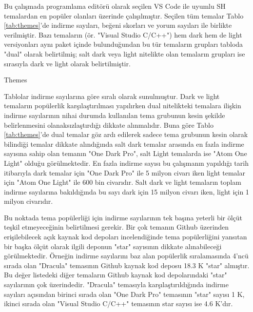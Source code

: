 \documentclass{article}
\begin{document}
Bu çalışmada programlama editörü olarak seçilen VS Code ile uyumlu SH temalardan en popüler olanları üzerinde
çalışılmıştır.  Seçilen tüm temalar Tablo \ref{tab:themes}'de indirme sayıları, beğeni skorları ve yorum sayıları ile
birlikte verilmiştir.  Bazı temaların (ör. "Visual Studio C/C++") hem dark hem de light versiyonları aynı paket içinde
bulunduğundan bu tür temaların grupları tabloda "dual" olarak belirtilmiş; salt dark veya light nitelikte olan temaların
grupları ise sırasıyla dark ve light olarak belirtilmiştir.


\begin{table}[H]

  \caption{Themes}
  \label{tab:themes}
\end{table}

Tablolar indirme sayılarına göre sıralı olarak sunulmuştur.  Dark ve light temaların popülerlik karşılaştırılması
yapılırken dual nitelikteki temalara ilişkin indirme sayılarının nihai durumda kullanılan tema grubunun kesin şekilde
belirlenmesini olanaksızlaştırdığı dikkate alınmalıdır.  Buna göre Tablo \ref{tab:themes}'de dual temalar göz ardı
edilerek sadece tema grubunun kesin olarak bilindiği temalar dikkate alındığında salt dark temalar arasında en fazla indirme
sayısına sahip olan temanın "One Dark Pro", salt Light temalarda ise "Atom One Light" olduğu görülmektedir. En fazla indirme sayısı bu
çalışmanın yapıldığı tarih itibarıyla dark temalar için "One Dark Pro" ile 5 milyon civarı iken light temalar için "Atom
One Light" ile 600 bin civarıdır. Salt dark ve light temaların toplam indirme sayılarına bakıldığında bu sayı dark için 15 milyon
civarı iken, light için 1 milyon civarıdır.

Bu noktada tema popülerliği için indirme sayılarının tek başına yeterli bir ölçüt teşkil etmeyeceğinin belirtilmesi
gerekir.  Bir çok temanın Github üzerinden erişilebilecek açık kaynak kod depoları incelendiğinde tema popülerliğini
yansıtan bir başka ölçüt olarak ilgili deponun "star" sayısının dikkate alınabileceği görülmektedir. Örneğin indirme
sayılarını baz alan popülerlik sıralamasında 4'ncü sırada olan "Dracula" temasının Github kaynak kod deposu 18.3 K
"star" almıştır\cite{draculatheme2022github}. Bu değer listedeki diğer temaların Github kaynak kod depolarındaki "star"
sayılarının çok üzerindedir.  "Dracula" temasıyla karşılaştırıldığında indirme sayıları açısından birinci sırada olan
"One Dark Pro" temasının "star" sayısı 1 K\cite{onedarkprotheme2022github}, ikinci sırada olan "Visual Studio C/C++"
temasının star sayısı ise 4.6 K'dır\cite{visualstudiotheme2022github}.
\end{document}
